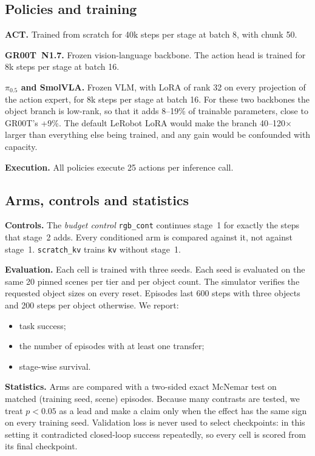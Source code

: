 \documentclass[letterpaper, 10pt, journal, twoside]{IEEEtran}
\newcommand{\arm}[1]{\texttt{#1}}
\begin{document}
\subsection{Policies and training}

\textbf{ACT.} Trained from scratch for 40k steps per stage at batch 8, with
chunk 50.

\textbf{GR00T~N1.7.} Frozen vision-language backbone. The action head is
trained for 8k steps per stage at batch 16.

\textbf{$\pi_{0.5}$ and SmolVLA.} Frozen VLM, with LoRA of rank 32 on every
projection of the action expert, for 8k steps per stage at batch 16. For
these two backbones the object branch is low-rank, so that it adds 8--19\% of
trainable parameters, close to GR00T's +9\%. The default LeRobot LoRA would
make the branch 40--120$\times$ larger than everything else being trained,
and any gain would be confounded with capacity.

\textbf{Execution.} All policies execute 25 actions per inference call.

\subsection{Arms, controls and statistics}

\textbf{Controls.} The \emph{budget control} \arm{rgb\_cont} continues
stage~1 for exactly the steps that stage~2 adds. Every conditioned arm is
compared against it, not against stage~1. \arm{scratch\_kv} trains \arm{kv}
without stage~1.

\textbf{Evaluation.} Each cell is trained with three seeds. Each seed is
evaluated on the same 20 pinned scenes per tier and per object count. The
simulator verifies the requested object sizes on every reset. Episodes last
600 steps with three objects and 200 steps per object otherwise. We report:
\begin{itemize}
  \item task success;
  \item the number of episodes with at least one transfer;
  \item stage-wise survival.
\end{itemize}

\textbf{Statistics.} Arms are compared with a two-sided exact McNemar test
on matched (training seed, scene) episodes. Because many contrasts are
tested, we treat $p<0.05$ as a lead and make a claim only when the effect
has the same sign on every training seed. Validation loss is never used to
select checkpoints: in this setting it contradicted closed-loop success
repeatedly, so every cell is scored from its final checkpoint.
\end{document}

